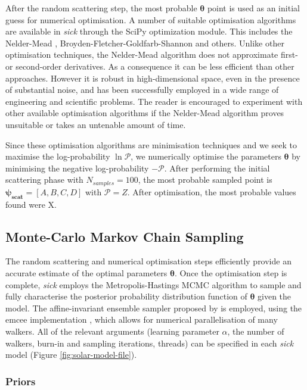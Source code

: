 \documentclass{aastex}
\newcommand{\sick}{\textit{sick}}
\begin{document}
After the random scattering step, the most probable $\bm{\theta}$ point is used as an initial guess for numerical optimisation. A number of suitable optimisation algorithms are available in \sick{} through the SciPy optimization \cite{scipy,scipy-optimize} module. This includes the Nelder-Mead \citet[default;][]{nelder-mead}, Broyden-Fletcher-Goldfarb-Shannon \cite{bfgs} and others. Unlike other optimisation techniques, the Nelder-Mead algorithm does not approximate first- or second-order derivatives. As a consequence it can be less efficient than other approaches. However it is robust in high-dimensional space, even in the presence of substantial noise, and has been successfully employed in a wide range of engineering and scientific problems. The reader is encouraged to experiment with other available optimisation algorithms if the Nelder-Mead algorithm proves unsuitable or takes an untenable amount of time.

Since these optimisation algorithms are minimisation techniques and we seek to maximise the log-probability $\ln\mathcal{P}$, we numerically optimise the parameters $\bm{\theta}$ by minimising the negative log-probability $-\mathcal{P}$. After performing the initial scattering phase with $N_{samples} = 100$, the most probable sampled point is $\bm{\psi_{scat}} = [A,B,C,D]$ with $\mathcal{P} = Z$. After optimisation, the most probable values found were X.


\subsection{Monte-Carlo Markov Chain Sampling}
\label{sec:mcmc}

The random scattering and numerical optimisation steps efficiently provide an accurate estimate of the optimal parameters $\bm{\theta}$. Once the optimisation step is complete, \sick{} employs the Metropolis-Hastings MCMC algorithm to sample and fully characterise the posterior probability distribution function of $\bm{\theta}$ given the model. The affine-invariant ensemble sampler proposed by \citet{goodman;weave} is employed, using the emcee implementation \citep{emcee}, which allows for numerical parallelisation of many walkers. All of the relevant arguments (learning parameter $\alpha$, the number of walkers, burn-in and sampling iterations, threads) can be specified in each \sick{} model (Figure \ref{fig:solar-model-file}).

\subsubsection{Priors}
\label{sec:priors}
\end{document}
